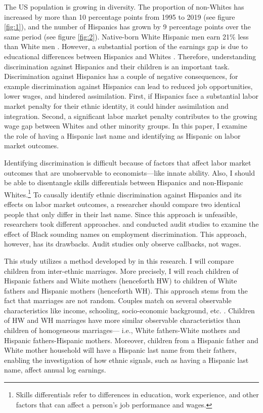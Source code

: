 \documentclass{wptemp}
\begin{document}
The US population is growing in diversity. The proportion of non-Whites has increased by more than 10 percentage points from 1995 to 2019 (see figure \ref{fig:1}), and the number of Hispanics has grown by 9 percentage points over the same period (see figure \ref{fig:2}). Native-born White Hispanic men earn 21\% less than White men \citep{duncan2018identifying}. However, a substantial portion of the earnings gap is due to educational differences between Hispanics and Whites \citep{duncan2006hispanics, duncan2018socioeconomic}. Therefore, understanding discrimination against Hispanics and their children is an important task. Discrimination against Hispanics has a couple of negative consequences, for example discrimination against Hispanics can lead to reduced job opportunities, lower wages, and hindered assimilation. First, if Hispanics face a substantial labor market penalty for their ethnic identity, it could hinder assimilation and integration. Second, a significant labor market penalty contributes to the growing wage gap between Whites and other minority groups. In this paper, I examine the role of having a Hispanic last name and identifying as Hispanic on labor market outcomes. 

Identifying discrimination is difficult because of factors that affect labor market outcomes that are unobservable to economists---like innate ability. Also, I should be able to disentangle skills differentials between Hispanics and non-Hispanic Whites.\footnote{Skills differentials refer to differences in education, work experience, and other factors that can affect a person's job performance and wages.} To causally identify ethnic discrimination against Hispanics and its effects on labor market outcomes, a researcher should compare two identical people that only differ in their last name. Since this approach is unfeasible, researchers took different approaches. \citet{bertrand2004emily} and \citet{fryer2004causes} conducted audit studies to examine the effect of Black sounding names on employment discrimination. This approach, however, has its drawbacks. Audit studies only observe callbacks, not wages. 

This study utilizes a method developed by \citet{rubinstein2014pride} in this research. I will compare children from inter-ethnic marriages. More precisely, I will reach children of Hispanic fathers and White mothers (henceforth HW) to children of White fathers and Hispanic mothers (henceforth  WH). This approach stems from the fact that marriages are not random. Couples match on several observable characteristics like income, schooling, socio-economic background, etc. \citep{averettBetterWorseRelationship2008, averettEconomicRealityBeauty1996, beckerTheoryMarriagePart1973, beckerTheoryMarriagePart1974, beckerTreatiseFamily1993, browningCollectiveUnitaryModels2006, chiapporiFatterAttractionAnthropometric2012}. Children of HW and WH marriages have more similar observable characteristics than children of homogeneous marriages--- i.e., White fathers-White mothers and Hispanic fathers-Hispanic mothers. Moreover, children from a Hispanic father and White mother household will have a Hispanic last name from their fathers, enabling the investigation of how ethnic signals, such as having a Hispanic last name, affect annual log earnings.
\end{document}

